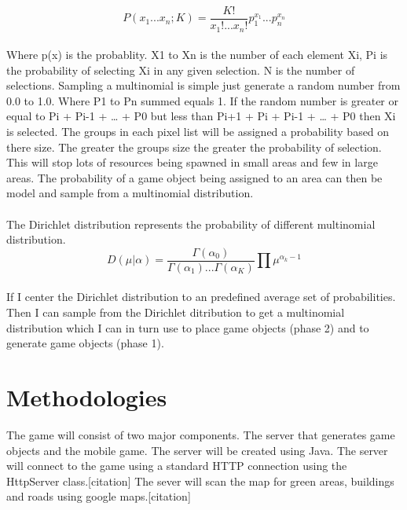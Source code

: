 \documentclass[11pt,openright,a4paper]{report}
\begin{document}
		\begin{equation}
			P(x_1...x_n;K) = \frac{K!}{x_1!...x_n!} p_1^{x_1} ... p_n^{x_n}
		\end{equation}
		
		\paragraph{}Where p(x) is the probablity. X1 to Xn is the number of each element Xi, Pi is the probability of selecting Xi in any given selection. N is the number of selections. Sampling a multinomial is simple just generate a random number from 0.0 to 1.0. Where P1 to Pn summed equals 1. If the random number is greater or equal to Pi + Pi-1 + … + P0 but less than Pi+1 + Pi + Pi-1 + … + P0 then Xi is selected. The groups in each pixel list will be assigned a probability based on there size. The greater the groups size the greater the probability of selection. This will stop lots of resources being spawned in small areas and few in large areas. The probability of a game object being assigned to an area can then be model and sample from a multinomial distribution. 
		
		\paragraph{}The Dirichlet distribution represents the probability of different multinomial distribution.
		\begin{equation}
			D(\mu|\alpha ) = \frac{\Gamma(\alpha_0)}{\Gamma(\alpha_1)...\Gamma(\alpha_K)}\prod\mu^{\alpha_k-1}
		\end{equation}
		\paragraph{}If I center the Dirichlet distribution to an predefined average set of probabilities. Then I can sample from the Dirichlet ditribution to get a multinomial distribution which I can in turn use to place game objects (phase 2) and to generate game objects (phase 1).
		
		\section{Methodologies}
		The game will consist of two major components. The server that generates game objects and the mobile game. The server will be created using Java. The server will connect to the game using a standard HTTP connection using the HttpServer class.[citation] The sever will scan the map for green areas, buildings and roads using google maps.[citation] 
		
\end{document}
